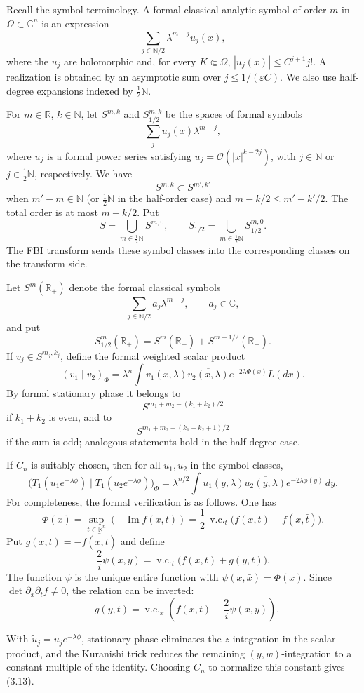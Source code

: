 \documentclass[11pt,a4paper]{article}
\newcommand{\R}{\mathbb R}
\newcommand{\C}{\mathbb C}
\newcommand{\N}{\mathbb N}
\newcommand{\cO}{\mathcal O}
\newcommand{\eps}{\varepsilon}
\newcommand{\vc}{\operatorname{v.c.}}
\numberwithin{equation}{section}
\theoremstyle{remark}
\begin{document}
Recall the symbol terminology. A formal classical analytic symbol of order $m$ in $\Omega\subset\C^n$ is an expression
\[
\sum_{j\in\N/2}\lambda^{m-j}u_j(x),
\]
where the $u_j$ are holomorphic and, for every $K\Subset\Omega$, $|u_j(x)|\le C^{j+1}j!$. A realization is obtained by an asymptotic sum over $j\le1/(\eps C)$. We also use half-degree expansions indexed by $\frac12\N$.

For $m\in\R$, $k\in\N$, let $S^{m,k}$ and $S_{1/2}^{m,k}$ be the spaces of formal symbols
\[
\sum_j u_j(x)\lambda^{m-j},
\]
where $u_j$ is a formal power series satisfying $u_j=\cO(|x|^{k-2j})$, with $j\in\N$ or $j\in\frac12\N$, respectively. We have
\[
S^{m,k}\subset S^{m',k'}
\]
when $m'-m\in\N$ (or $\frac12\N$ in the half-order case) and $m-k/2\le m'-k'/2$. The total order is at most $m-k/2$. Put
\[
S=\bigcup_{m\in\frac12\N}S^{m,0},
\qquad
S_{1/2}=\bigcup_{m\in\frac12\N}S_{1/2}^{m,0}.
\]
The FBI transform sends these symbol classes into the corresponding classes on the transform side.

Let $S^m(\R_+)$ denote the formal classical symbols
\[
\sum_{j\in\N/2}a_j\lambda^{m-j},\qquad a_j\in\C,
\]
and put
\[
S_{1/2}^m(\R_+)=S^m(\R_+)+S^{m-1/2}(\R_+).
\]
If $v_j\in S^{m_j,k_j}$, define the formal weighted scalar product
\begin{equation}
(v_1\mid v_2)_\Phi=\lambda^n\int
v_1(x,\lambda)\overline{v_2(x,\lambda)}e^{-2\lambda\Phi(x)}L(dx).
\end{equation}
By formal stationary phase it belongs to
\[
S^{m_1+m_2-(k_1+k_2)/2}
\]
if $k_1+k_2$ is even, and to
\[
S^{m_1+m_2-(k_1+k_2+1)/2}
\]
if the sum is odd; analogous statements hold in the half-degree case.

If $C_n$ is suitably chosen, then for all $u_1,u_2$ in the symbol classes,
\begin{equation}
\bigl(T_1(u_1e^{-\lambda\phi})\mid T_1(u_2e^{-\lambda\phi})\bigr)_\Phi
=\lambda^{n/2}\int u_1(y,\lambda)\overline{u_2(y,\lambda)}e^{-2\lambda\phi(y)}\,dy.
\end{equation}
For completeness, the formal verification is as follows. One has
\[
\Phi(x)=\sup_{t\in\R^n}(-\operatorname{Im}f(x,t))
=\frac12\,\vc_t\bigl(f(x,t)-\overline{f(x,\bar t)}\bigr).
\]
Put $g(x,t)=-\overline{f(x,\bar t)}$ and define
\begin{equation}
\frac2i\psi(x,y)=\vc_t\bigl(f(x,t)+g(y,t)\bigr).
\end{equation}
The function $\psi$ is the unique entire function with $\psi(x,\bar x)=\Phi(x)$. Since $\det \partial_x\partial_t f\ne0$, the relation can be inverted:
\begin{equation}
-g(y,t)=\vc_x\left(f(x,t)-\frac2i\psi(x,y)\right).
\tag{3.14'}
\end{equation}
\addtocounter{equation}{-1}
With $\widetilde u_j=u_je^{-\lambda\phi}$, stationary phase eliminates the $z$-integration in the scalar product, and the Kuranishi trick reduces the remaining $(y,w)$-integration to a constant multiple of the identity. Choosing $C_n$ to normalize this constant gives (3.13).
\end{document}
